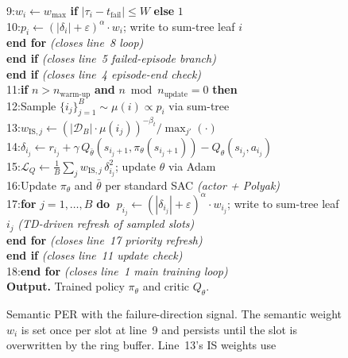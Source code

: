 \begin{figure}[t]
{{\quad\textsc{9:}\quad\quad\quad\quad\;$w_i\!\leftarrow\!w_{\max}$ \textbf{if} $|\tau_i\!-\!t_{\text{fail}}|\!\le\!W$ \textbf{else} $1$\\
\quad\textsc{10:}\quad\quad\quad\quad\;$p_i\!\leftarrow\!(|\delta_i|+\varepsilon)^\alpha\!\cdot\!w_i$;
write to sum-tree leaf $i$\\
\quad\quad\quad\;\textbf{end for} \hfill\textit{(closes line~8 loop)}\\
\quad\quad\;\textbf{end if} \hfill\textit{(closes line~5 failed-episode branch)}\\
\quad\;\textbf{end if} \hfill\textit{(closes line~4 episode-end check)}\\
\quad\textsc{11:}\quad\;\textbf{if} $n>n_{\text{warm-up}}$ \textbf{and} $n \bmod n_{\text{update}}\!=\!0$ \textbf{then}\\
\quad\textsc{12:}\quad\quad\;Sample $\{i_j\}_{j=1}^{B}\!\sim\!\mu(i)\!\propto\!p_i$ via sum-tree\\
\quad\textsc{13:}\quad\quad\;$w_{\text{IS},j}\!\leftarrow\!(|\mathcal{D}_B|\!\cdot\!\mu(i_j))^{-\beta_t}\big/\max_{j'}(\cdot)$\\
\quad\textsc{14:}\quad\quad\;$\delta_{i_j}\!\leftarrow\!r_{i_j}\!+\!\gamma\,Q_{\bar\theta}(s_{i_j+1},\pi_\theta(s_{i_j+1}))\!-\!Q_\theta(s_{i_j},a_{i_j})$\\
\quad\textsc{15:}\quad\quad\;$\mathcal{L}_Q\!\leftarrow\!\tfrac{1}{B}\!\sum_j w_{\text{IS},j}\,\delta_{i_j}^{2}$;
update $\theta$ via Adam\\
\quad\textsc{16:}\quad\quad\;Update $\pi_\theta$ and $\bar\theta$ per standard SAC \hfill\textit{(actor + Polyak)}\\
\quad\textsc{17:}\quad\quad\;\textbf{for} $j\!=\!1,\dots,B$ \textbf{do}
$\;p_{i_j}\!\leftarrow\!(|\delta_{i_j}|\!+\!\varepsilon)^\alpha\!\cdot\!w_{i_j}$;
write to sum-tree leaf $i_j$ \hfill\textit{(TD-driven refresh of sampled slots)}\\
\quad\quad\quad\;\textbf{end for} \hfill\textit{(closes line~17 priority refresh)}\\
\quad\quad\;\textbf{end if} \hfill\textit{(closes line~11 update check)}\\
\quad\textsc{18:}\;\textbf{end for} \hfill\textit{(closes line~1 main training loop)}\\[2pt]
\textbf{Output.} Trained policy $\pi_\theta$ and critic $Q_\theta$.
}}
\caption{Semantic PER with the failure-direction signal. The
semantic weight $w_i$ is set once per slot at line~9 and persists until
the slot is overwritten by the ring buffer. Line~13's IS weights use
}
\end{figure}
